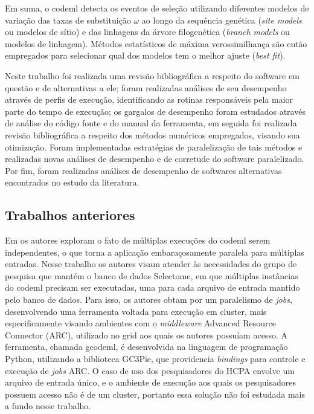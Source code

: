 \documentclass[cic,tc]{iiufrgs}
\begin{document}
Em suma, o codeml detecta os eventos de seleção utilizando diferentes modelos
de variação das taxas de substituição $\omega$ ao longo da sequência genética
(\textit{site models} ou modelos de sítio) e das linhagens da árvore
filogenética (\textit{branch models} ou modelos de linhagem). Métodos
estatísticos de máxima verossimilhança são então empregados para selecionar
qual dos modelos tem o melhor ajuste (\textit{best fit}).

Neste trabalho foi realizada uma revisão bibliográfica a respeito do software
em questão e de alternativas a ele; foram realizadas análises de seu desempenho
através de perfis de execução, identificando as rotinas responsáveis pela maior
parte do tempo de execução; os gargalos de desempenho foram estudados através
de análise do código fonte e do manual da ferramenta, em seguida foi realizada
revisão bibliográfica a respeito dos métodos numéricos empregados, visando sua
otimização. Foram implementadas estratégias de paralelização de tais métodos e
realizadas novas análises de desempenho e de corretude do software
paralelizado. Por fim, foram realizadas análises de desempenho de softwares
alternativas encontrados no estudo da literatura.

\subsection{Trabalhos anteriores}

Em \cite{moretti2012gcodeml} os autores exploram o fato de múltiplas execuções
do codeml serem independentes, o que torna a aplicação embaraçosamente
paralela para múltiplas entradas. Nesse trabalho os autores visam atender às
necessidades do grupo de pesquisa que mantém o banco de dados Selectome, em
que múltiplas instâncias do codeml precisam ser executadas, uma para cada
arquivo de entrada mantido pelo banco de dados. Para isso, os autores obtam
por um paralelismo de \textit{jobs}, desenvolvendo uma ferramenta voltada
para execução em cluster, mais especificamente visando ambientes com o
\textit{middleware} Advanced Resource Connector (ARC), utilizado no grid aos
quais os autores possuíam acesso. A ferramenta, chamada gcodeml, é desenvolvida
na linguagem de programação Python, utilizando a biblioteca GC3Pie, que
providencia \textit{bindings} para controle e execução de \textit{jobs} ARC. O
caso de uso dos pesquisadores do HCPA envolve um arquivo de entrada único, e
o ambiente de execução aos quais os pesquisadores possuem acesso não é de um
cluster, portanto essa solução não foi estudada mais a fundo nesse trabalho.
\end{document}
